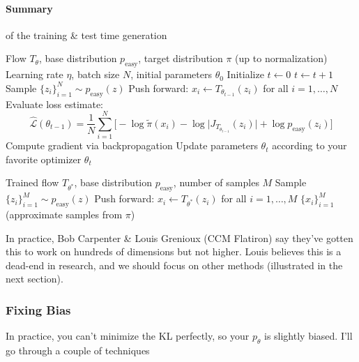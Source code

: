 \paragraph{Summary} of the training \& test time generation
\begin{algorithm}[h!]
\caption{Training}
\begin{algorithmic}[1]
\Require Flow $T_\theta$, base distribution $p_{\mathrm{easy}}$, target distribution $\pi$ (up to normalization) 
\Require Learning rate $\eta$, batch size $N$, initial parameters $ {\theta}_0$
\State Initialize $t \gets 0$
    \State $t \gets t + 1$
    \State Sample $\{z_i\}_{i=1}^N \sim p_{\mathrm{easy}}(z)$
    \State Push forward: $x_i \gets T_{ {\theta}_{t-1}}(z_i)$ for all $i = 1, \dots, N$
    \State Evaluate loss estimate:
    \[
        \hat{\mathcal{L}}( {\theta}_{t-1}) = \frac{1}{N} \sum_{i=1}^{N} \Big[ -\log \tilde{\pi}(x_i) - \log \big|J_{T_{ {\theta}_{t-1}}}(z_i)\big| + \log p_{\mathrm{easy}}(z_i) \Big]
    \]
    \State Compute gradient via backpropagation
	\State Update parameters $ {\theta}_{t}$ according to your favorite optimizer
\EndWhile
\State \Return $ {\theta}_t$
\end{algorithmic}
\end{algorithm}

\begin{algorithm}[h!]
\caption{Test time, generation of samples}
\begin{algorithmic}[1]
\Require Trained flow $T_{ {\theta}^*}$, base distribution $p_{\mathrm{easy}}$, number of samples $M$
\State Sample $\{z_i\}_{i=1}^M \sim p_{\mathrm{easy}}(z)$
\State Push forward: $x_i \gets T_{ {\theta}^*}(z_i)$ for all $i = 1, \dots, M$
\State \Return $\{x_i\}_{i=1}^M$ \quad (approximate samples from $\pi$)
\end{algorithmic}
\end{algorithm}

In practice, Bob Carpenter \& Louis Grenioux (CCM Flatiron) say they've gotten this to work on hundreds of dimensions but not higher. Louis believes this is a dead-end in research, and we should focus on other methods (illustrated in the next section).

\subsubsection{Fixing Bias}
In practice, you can't minimize the KL perfectly, so your $p_\theta$ is slightly biased. I'll go through a couple of techniques

